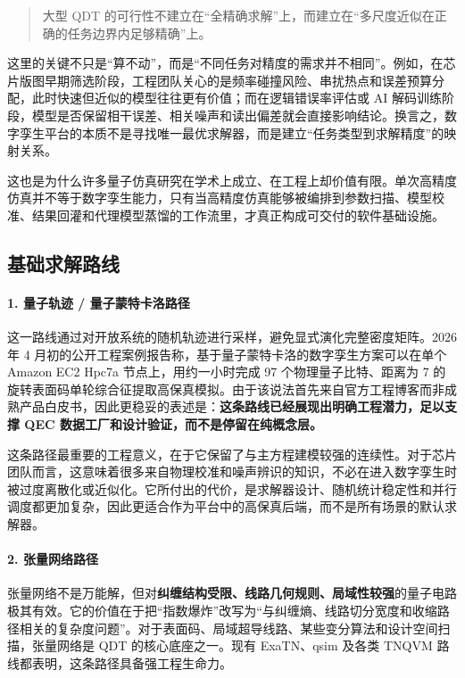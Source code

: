 \documentclass[11pt,a4paper]{article}
\newcommand{\QDT}{QDT}
\newcommand{\QEC}{QEC}
\begin{document}
\begin{quote}
大型 \QDT{} 的可行性不建立在“全精确求解”上，而建立在“多尺度近似在正确的任务边界内足够精确”上。
\end{quote}

这里的关键不只是“算不动”，而是“不同任务对精度的需求并不相同”。例如，在芯片版图早期筛选阶段，工程团队关心的是频率碰撞风险、串扰热点和误差预算分配，此时快速但近似的模型往往更有价值；而在逻辑错误率评估或 AI 解码训练阶段，模型是否保留相干误差、相关噪声和读出偏差就会直接影响结论。换言之，数字孪生平台的本质不是寻找唯一最优求解器，而是建立“任务类型到求解精度”的映射关系。

这也是为什么许多量子仿真研究在学术上成立、在工程上却价值有限。单次高精度仿真并不等于数字孪生能力，只有当高精度仿真能够被编排到参数扫描、模型校准、结果回灌和代理模型蒸馏的工作流里，才真正构成可交付的软件基础设施。

\subsection{基础求解路线}

\paragraph{1. 量子轨迹 / 量子蒙特卡洛路径}
这一路线通过对开放系统的随机轨迹进行采样，避免显式演化完整密度矩阵。2026 年 4 月初的公开工程案例报告称，基于量子蒙特卡洛的数字孪生方案可以在单个 Amazon EC2 Hpc7a 节点上，用约一小时完成 97 个物理量子比特、距离为 7 的旋转表面码单轮综合征提取高保真模拟。由于该说法首先来自官方工程博客而非成熟产品白皮书，因此更稳妥的表述是：\textbf{这条路线已经展现出明确工程潜力，足以支撑 \QEC{} 数据工厂和设计验证，而不是停留在纯概念层。}

这条路径最重要的工程意义，在于它保留了与主方程建模较强的连续性。对于芯片团队而言，这意味着很多来自物理校准和噪声辨识的知识，不必在进入数字孪生时被过度离散化或近似化。它所付出的代价，是求解器设计、随机统计稳定性和并行调度都更加复杂，因此更适合作为平台中的高保真后端，而不是所有场景的默认求解器。

\paragraph{2. 张量网络路径}
张量网络不是万能解，但对\textbf{纠缠结构受限、线路几何规则、局域性较强}的量子电路极其有效。它的价值在于把“指数爆炸”改写为“与纠缠熵、线路切分宽度和收缩路径相关的复杂度问题”。对于表面码、局域超导线路、某些变分算法和设计空间扫描，张量网络是 \QDT{} 的核心底座之一。现有 ExaTN、qsim 及各类 TNQVM 路线都表明，这条路径具备强工程生命力。
\end{document}
